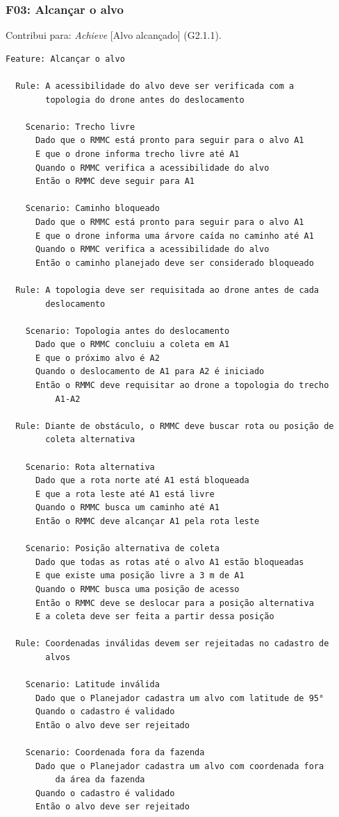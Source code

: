 \documentclass[a4paper, 12pt]{article}
\begin{document}
\Needspace{8cm}
\subsubsection{F03: Alcançar o alvo}

Contribui para: \textit{Achieve} [Alvo alcançado] (G2.1.1).

{\small
\begin{verbatim}
Feature: Alcançar o alvo

  Rule: A acessibilidade do alvo deve ser verificada com a
        topologia do drone antes do deslocamento

    Scenario: Trecho livre
      Dado que o RMMC está pronto para seguir para o alvo A1
      E que o drone informa trecho livre até A1
      Quando o RMMC verifica a acessibilidade do alvo
      Então o RMMC deve seguir para A1

    Scenario: Caminho bloqueado
      Dado que o RMMC está pronto para seguir para o alvo A1
      E que o drone informa uma árvore caída no caminho até A1
      Quando o RMMC verifica a acessibilidade do alvo
      Então o caminho planejado deve ser considerado bloqueado

  Rule: A topologia deve ser requisitada ao drone antes de cada
        deslocamento

    Scenario: Topologia antes do deslocamento
      Dado que o RMMC concluiu a coleta em A1
      E que o próximo alvo é A2
      Quando o deslocamento de A1 para A2 é iniciado
      Então o RMMC deve requisitar ao drone a topologia do trecho
          A1-A2

  Rule: Diante de obstáculo, o RMMC deve buscar rota ou posição de
        coleta alternativa

    Scenario: Rota alternativa
      Dado que a rota norte até A1 está bloqueada
      E que a rota leste até A1 está livre
      Quando o RMMC busca um caminho até A1
      Então o RMMC deve alcançar A1 pela rota leste

    Scenario: Posição alternativa de coleta
      Dado que todas as rotas até o alvo A1 estão bloqueadas
      E que existe uma posição livre a 3 m de A1
      Quando o RMMC busca uma posição de acesso
      Então o RMMC deve se deslocar para a posição alternativa
      E a coleta deve ser feita a partir dessa posição

  Rule: Coordenadas inválidas devem ser rejeitadas no cadastro de
        alvos

    Scenario: Latitude inválida
      Dado que o Planejador cadastra um alvo com latitude de 95°
      Quando o cadastro é validado
      Então o alvo deve ser rejeitado

    Scenario: Coordenada fora da fazenda
      Dado que o Planejador cadastra um alvo com coordenada fora
          da área da fazenda
      Quando o cadastro é validado
      Então o alvo deve ser rejeitado
\end{verbatim}
}
\end{document}
